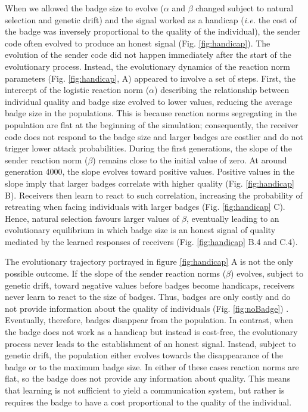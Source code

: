 \documentclass[
  12pt,
]{article}
\begin{document}
When we allowed the badge size to evolve (\(\alpha\) and \(\beta\)
changed subject to natural selection and genetic drift) and the signal
worked as a handicap (\emph{i.e.} the cost of the badge was inversely
proportional to the quality of the individual), the sender code often
evolved to produce an honest signal (Fig. \ref{fig:handicap}). The
evolution of the sender code did not happen immediately after the start
of the evolutionary process. Instead, the evolutionary dynamics of the
reaction norm parameters (Fig. \ref{fig:handicap}, A) appeared to
involve a set of steps. First, the intercept of the logistic reaction
norm (\(\alpha\)) describing the relationship between individual quality
and badge size evolved to lower values, reducing the average badge size
in the populations. This is because reaction norms segregating in the
population are flat at the beginning of the simulation; consequently,
the receiver code does not respond to the badge size and larger badges
are costlier and do not trigger lower attack probabilities. During the
first generations, the slope of the sender reaction norm (\(\beta\))
remains close to the initial value of zero. At around generation 4000,
the slope evolves toward positive values. Positive values in the slope
imply that larger badges correlate with higher quality (Fig.
\ref{fig:handicap} B). Receivers then learn to react to such
correlation, increasing the probability of retreating when facing
individuals with larger badges (Fig. \ref{fig:handicap} C). Hence,
natural selection favours larger values of \(\beta\), eventually leading
to an evolutionary equilibrium in which badge size is an honest signal
of quality mediated by the learned responses of receivers (Fig.
\ref{fig:handicap} B.4 and C.4).

The evolutionary trajectory portrayed in figure \ref{fig:handicap} A is
not the only possible outcome. If the slope of the sender reaction norms
(\(\beta\)) evolves, subject to genetic drift, toward negative values
before badges become handicaps, receivers never learn to react to the
size of badges. Thus, badges are only costly and do not provide
information about the quality of individuals (Fig. \ref{fig:noBadge}) .
Eventually, therefore, badges disappear from the population. In
contrast, when the badge does not work as a handicap but instead is
cost-free, the evolutionary process never leads to the establishment of
an honest signal. Instead, subject to genetic drift, the population
either evolves towards the disappearance of the badge or to the maximum
badge size. In either of these cases reaction norms are flat, so the
badge does not provide any information about quality. This means that
learning is not sufficient to yield a communication system, but rather
is requires the badge to have a cost proportional to the quality of the
individual.
\end{document}
